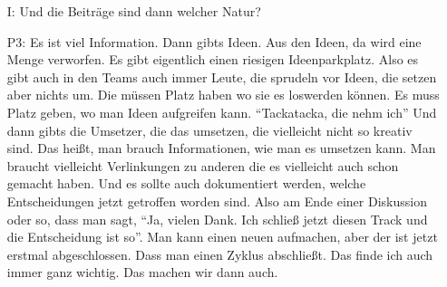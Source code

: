 \begin{itemize}
    \item[I:] Und die Beitr{\"a}ge sind dann welcher Natur?
    \item[P3:] Es ist viel Information. Dann gibts Ideen. Aus den Ideen, da wird eine Menge verworfen. Es gibt eigentlich einen riesigen Ideenparkplatz. Also es gibt auch in den Teams auch immer Leute, die sprudeln vor Ideen, die setzen aber nichts um. Die m{\"u}ssen Platz haben wo sie es loswerden k{\"o}nnen. Es muss Platz geben, wo man Ideen aufgreifen kann. "`Tackatacka, die nehm ich"' Und dann gibts die Umsetzer, die das umsetzen, die vielleicht nicht so kreativ sind. Das hei{\ss}t, man brauch Informationen, wie man es umsetzen kann. Man braucht vielleicht Verlinkungen zu anderen die es vielleicht auch schon gemacht haben. Und es sollte auch dokumentiert werden, welche Entscheidungen jetzt getroffen worden sind. Also am Ende einer Diskussion oder so, dass man sagt, "`Ja, vielen Dank. Ich schlie{\ss} jetzt diesen Track und die Entscheidung ist so"'. Man kann einen neuen aufmachen, aber der ist jetzt erstmal abgeschlossen. Dass man einen Zyklus abschlie{\ss}t. Das finde ich auch immer ganz wichtig. Das machen wir dann auch.
\end{itemize}

